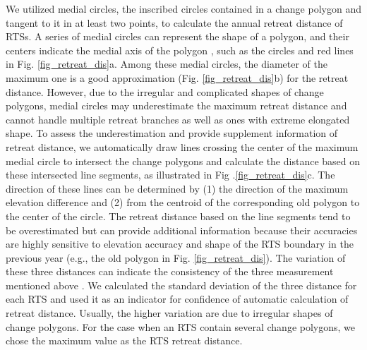\documentclass[authoryear,preprint,review,12pt]{elsarticle}
\begin{document}
We utilized medial circles, the inscribed circles contained in a change polygon and tangent to it in at least two points, to calculate the annual retreat distance of RTSs. 
A series of medial circles can represent the shape of a polygon, and their centers indicate the medial axis of the polygon \citep{zhu2014computing}, such as the circles and red lines in Fig. \ref{fig_retreat_dis}a. 
Among these medial circles, the diameter of the maximum one is a good approximation (Fig. \ref{fig_retreat_dis}b) for the retreat distance.
However, due to the irregular and complicated shapes of change polygons, medial circles may underestimate the maximum retreat distance and cannot handle multiple retreat branches as well as ones with extreme elongated shape. 
To assess the underestimation and provide supplement information of retreat distance, we automatically draw lines crossing the center of the maximum medial circle to intersect the change polygons and calculate the distance based on these intersected line segments, as illustrated in Fig .\ref{fig_retreat_dis}c. 
The direction of these lines can be determined by (1) the direction of the maximum elevation difference and (2) from the centroid of the corresponding old polygon to the center of the circle. 
The retreat distance based on the line segments tend to be overestimated but can provide additional information because their accuracies are highly sensitive to elevation accuracy and shape of the RTS boundary in the previous year (e.g., the old polygon in Fig. \ref{fig_retreat_dis}). 
The variation of these three distances can indicate the consistency of the three measurement mentioned above . %
We calculated the standard deviation of the three distance for each RTS and used it as an indicator for confidence of automatic calculation of retreat distance. 
Usually, the higher variation are due to irregular shapes of change polygons. 
For the case when an RTS contain several change polygons, we chose the maximum value as the RTS retreat distance.
\end{document}
